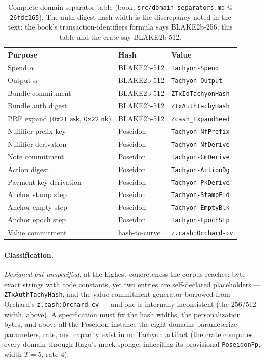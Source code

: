 \documentclass[11pt,a4paper]{article}
\theoremstyle{definition}
\newcommand{\ask}{\ensuremath{\mathsf{ask}}}
\newcommand{\nksym}{\ensuremath{\mathsf{nk}}}
\begin{document}
\begin{table}[htbp]
\centering
\footnotesize
\begin{tabular}{@{}lll@{}}
\toprule
Purpose & Hash & Value \\
\midrule
Spend $\alpha$          & BLAKE2b-512 & \texttt{Tachyon-Spend} \\
Output $\alpha$         & BLAKE2b-512 & \texttt{Tachyon-Output} \\
Bundle commitment       & BLAKE2b-512 & \texttt{ZTxIdTachyonHash} \\
Bundle auth digest      & BLAKE2b-512 & \texttt{ZTxAuthTachyHash} \\
PRF expand ($\mathtt{0x21}$ $\ask$, $\mathtt{0x22}$ $\nksym$)
                        & BLAKE2b-512 & \texttt{Zcash\_ExpandSeed} \\
\midrule
Nullifier prefix key    & Poseidon & \texttt{Tachyon-NfPrefix} \\
Nullifier derivation    & Poseidon & \texttt{Tachyon-NfDerive} \\
Note commitment         & Poseidon & \texttt{Tachyon-CmDerive} \\
Action digest           & Poseidon & \texttt{Tachyon-ActionDg} \\
Payment key derivation  & Poseidon & \texttt{Tachyon-PkDerive} \\
Anchor stamp step       & Poseidon & \texttt{Tachyon-StampFld} \\
Anchor empty step       & Poseidon & \texttt{Tachyon-EmptyBlk} \\
Anchor epoch step       & Poseidon & \texttt{Tachyon-EpochStp} \\
\midrule
Value commitment        & hash-to-curve & \texttt{z.cash:Orchard-cv} \\
\bottomrule
\end{tabular}
\caption{Complete domain-separator table (book,
\texttt{src/domain-separators.md} @ \texttt{26fdc165}). The auth-digest
hash width is the discrepancy noted in the text: the book's
transaction-identifiers formula says BLAKE2b-256; this table and the
crate say BLAKE2b-512.}
\label{tab:tachyon-design-domains}
\end{table}

\paragraph{Classification.} \emph{Designed but unspecified}, at the highest
concreteness the corpus reaches: byte-exact strings with code constants,
yet two entries are self-declared placeholders ---
\texttt{ZTxAuthTachyHash}, and the value-commitment generator borrowed
from Orchard's \texttt{z.cash:Orchard-cv} --- and one is internally
inconsistent (the 256/512 width, above).
A specification must fix the hash widths, the personalization
bytes, and above all the Poseidon instance the eight domains parameterize
--- parameters, rate, and capacity exist in no Tachyon artifact (the
crate computes every domain through Ragu's mock sponge, inheriting its
provisional \texttt{PoseidonFp}, width $T = 5$, rate $4$).
\end{document}
